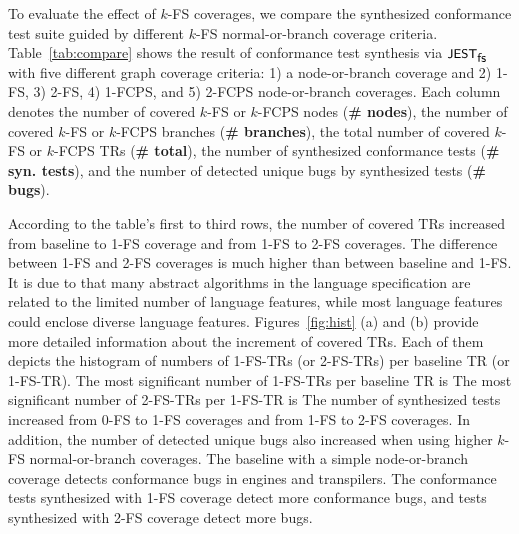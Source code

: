 To evaluate the effect of $k$-FS coverages, we compare the synthesized
conformance test suite guided by different $k$-FS normal-or-branch coverage
criteria.
%
Table~\ref{tab:compare} shows the result of conformance test synthesis via
$\textsf{\small JEST}_{\textsf{\small fs}}$ with five different graph coverage criteria: 1) a node-or-branch
coverage and 2) 1-FS, 3) 2-FS, 4) 1-FCPS, and 5) 2-FCPS node-or-branch
coverages.
%
Each column denotes the number of covered $k$-FS or $k$-FCPS nodes (\textbf{\#
nodes}), the number of covered $k$-FS or $k$-FCPS branches (\textbf{\#
branches}), the total number of covered $k$-FS or $k$-FCPS TRs (\textbf{\#
total}), the number of synthesized conformance tests (\textbf{\# syn. tests}),
and the number of detected unique bugs by synthesized tests (\textbf{\# bugs}).


According to the table's first to third rows, the number of covered
TRs increased  from baseline to 1-FS coverage and
 from 1-FS to 2-FS coverages.
%
The difference between 1-FS and 2-FS coverages is much higher than between
baseline and 1-FS.
%
It is due to that many abstract algorithms in the language specification are
related to the limited number of language features, while most language features
could enclose diverse language features.
%
Figures~\ref{fig:hist} (a) and (b) provide more detailed information about the
increment of covered TRs.
%
Each of them depicts the histogram of numbers of 1-FS-TRs (or 2-FS-TRs) per
baseline TR (or 1-FS-TR).
%
The most significant number of 1-FS-TRs per baseline TR is 
%
The most significant number of 2-FS-TRs per 1-FS-TR is 
%
The number of synthesized tests increased  from
0-FS to 1-FS coverages and  from 1-FS to 2-FS
coverages.
%
In addition, the number of detected unique bugs also increased when using higher
$k$-FS normal-or-branch coverages.
%
The baseline with a simple node-or-branch coverage detects 
conformance bugs in engines and transpilers.
%
The conformance tests synthesized with 1-FS coverage detect 
more conformance bugs, and tests synthesized with 2-FS coverage detect  more bugs.


